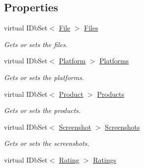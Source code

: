 \subsection*{Properties}
\begin{DoxyCompactItemize}
\item 
virtual I\+Db\+Set$<$ \hyperlink{class_open_1_1_g_i_1_1hypermart_1_1_models_1_1_file}{File} $>$ \hyperlink{class_open_1_1_g_i_1_1hypermart_1_1_d_a_l_1_1_hypermart_context_a07b9fbba8f80cd3c629d2372d9d4d5c6}{Files}
\begin{DoxyCompactList}\small\item\em Gets or sets the files. \end{DoxyCompactList}\item 
virtual I\+Db\+Set$<$ \hyperlink{class_open_1_1_g_i_1_1hypermart_1_1_models_1_1_platform}{Platform} $>$ \hyperlink{class_open_1_1_g_i_1_1hypermart_1_1_d_a_l_1_1_hypermart_context_af3f2a4e0cc12b56ba4b87e6de7e0d9b8}{Platforms}
\begin{DoxyCompactList}\small\item\em Gets or sets the platforms. \end{DoxyCompactList}\item 
virtual I\+Db\+Set$<$ \hyperlink{class_open_1_1_g_i_1_1hypermart_1_1_models_1_1_product}{Product} $>$ \hyperlink{class_open_1_1_g_i_1_1hypermart_1_1_d_a_l_1_1_hypermart_context_a0f25e3272e2504f80b53a8291ba7920e}{Products}
\begin{DoxyCompactList}\small\item\em Gets or sets the products. \end{DoxyCompactList}\item 
virtual I\+Db\+Set$<$ \hyperlink{class_open_1_1_g_i_1_1hypermart_1_1_models_1_1_screenshot}{Screenshot} $>$ \hyperlink{class_open_1_1_g_i_1_1hypermart_1_1_d_a_l_1_1_hypermart_context_af81b06ad6509a480c430f3f1c1d66c59}{Screenshots}
\begin{DoxyCompactList}\small\item\em Gets or sets the screenshots. \end{DoxyCompactList}\item 
virtual I\+Db\+Set$<$ \hyperlink{class_open_1_1_g_i_1_1hypermart_1_1_models_1_1_rating}{Rating} $>$ \hyperlink{class_open_1_1_g_i_1_1hypermart_1_1_d_a_l_1_1_hypermart_context_a70dcf8c6d47caf1bfdad2073e31dcb02}{Ratings}

\end{DoxyCompactItemize}
